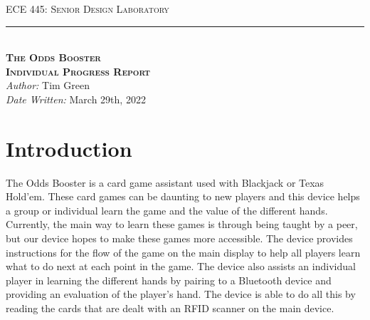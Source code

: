 \documentclass[12pt]{article}
\begin{document}
\begin{titlepage}
\begin{center}
{\LARGE \textsc{ECE 445: Senior Design Laboratory} \\ \vspace{8pt}}
\rule[13pt]{\textwidth}{1pt} \\ \vspace{120pt}
{\huge \textbf{\textsc{The Odds Booster}} \\ \vspace{8pt}}
{\LARGE \textbf{\textsc{Individual Progress Report}} \\ \vspace{30pt}} 
{\large \textit{Author:} Tim Green \\ \vspace{4pt}
\hspace{8pt} \textit{Date Written:} March 29th, 2022}
\vfill
\end{center}

\end{titlepage}
\setcounter{page}{2}

\section{Introduction}

The Odds Booster is a card game assistant used with Blackjack or Texas Hold'em. These card games can be daunting to new players and this device helps a group or individual learn the game and the value of the different hands. Currently, the main way to learn these games is through being taught by a peer, but our device hopes to make these games more accessible. The device provides instructions for the flow of the game on the main display to help all players learn what to do next at each point in the game. The device also assists an individual player in learning the different hands by pairing to a Bluetooth device and providing an evaluation of the player's hand. The device is able to do all this by reading the cards that are dealt with an RFID scanner on the main device.
\end{document}
